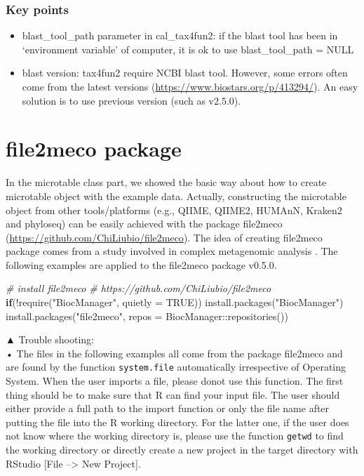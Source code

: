\documentclass[
]{book}
\newenvironment{Shaded}{\begin{snugshade}}{\end{snugshade}}
\newcommand{\AttributeTok}[1]{\textcolor[rgb]{0.77,0.63,0.00}{#1}}
\newcommand{\CommentTok}[1]{\textcolor[rgb]{0.56,0.35,0.01}{\textit{#1}}}
\newcommand{\ConstantTok}[1]{\textcolor[rgb]{0.00,0.00,0.00}{#1}}
\newcommand{\ControlFlowTok}[1]{\textcolor[rgb]{0.13,0.29,0.53}{\textbf{#1}}}
\newcommand{\FunctionTok}[1]{\textcolor[rgb]{0.00,0.00,0.00}{#1}}
\newcommand{\NormalTok}[1]{#1}
\newcommand{\SpecialCharTok}[1]{\textcolor[rgb]{0.00,0.00,0.00}{#1}}
\newcommand{\StringTok}[1]{\textcolor[rgb]{0.31,0.60,0.02}{#1}}
\providecommand{\tightlist}{%
  \setlength{\itemsep}{0pt}\setlength{\parskip}{0pt}}
\begin{document}
\hypertarget{key-points-10}{%
\subsection{Key points}\label{key-points-10}}

\begin{itemize}
\tightlist
\item
  blast\_tool\_path parameter in cal\_tax4fun2: if the blast tool has been in `environment variable' of computer, it is ok to use blast\_tool\_path = NULL
\item
  blast version: tax4fun2 require NCBI blast tool. However, some errors often come from the latest versions (\url{https://www.biostars.org/p/413294/}). An easy solution is to use previous version (such as v2.5.0).
\end{itemize}

\hypertarget{file2meco-package}{%
\chapter{file2meco package}\label{file2meco-package}}

In the microtable class part, we showed the basic way about how to create microtable object with the example data.
Actually, constructing the microtable object from other tools/platforms (e.g., QIIME, QIIME2, HUMAnN, Kraken2 and phyloseq)
can be easily achieved with the package file2meco (\url{https://github.com/ChiLiubio/file2meco}).
The idea of creating file2meco package comes from a study involved in complex metagenomic analysis \citep{Liu_Microbial_2022}.
The following examples are applied to the file2meco package v0.5.0.

\begin{Shaded}
\begin{Highlighting}[]
\CommentTok{\# install file2meco}
\CommentTok{\# https://github.com/ChiLiubio/file2meco}
\ControlFlowTok{if}\NormalTok{(}\SpecialCharTok{!}\FunctionTok{require}\NormalTok{(}\StringTok{"BiocManager"}\NormalTok{, }\AttributeTok{quietly =} \ConstantTok{TRUE}\NormalTok{)) }\FunctionTok{install.packages}\NormalTok{(}\StringTok{"BiocManager"}\NormalTok{)}
\FunctionTok{install.packages}\NormalTok{(}\StringTok{"file2meco"}\NormalTok{, }\AttributeTok{repos =}\NormalTok{ BiocManager}\SpecialCharTok{::}\FunctionTok{repositories}\NormalTok{())}
\end{Highlighting}
\end{Shaded}

▲ Trouble shooting:\\
• The files in the following examples all come from the package file2meco and are found by the function \texttt{system.file} automatically irrespective of Operating System.
When the user imports a file, please donot use this function.
The first thing should be to make sure that R can find your input file.
The user should either provide a full path to the import function or only the file name after putting the file into the R working directory.
For the latter one, if the user does not know where the working directory is,
please use the function \texttt{getwd} to find the working directory or directly create a new project in the target directory with RStudio {[}File --\textgreater{} New Project{]}.
\end{document}
